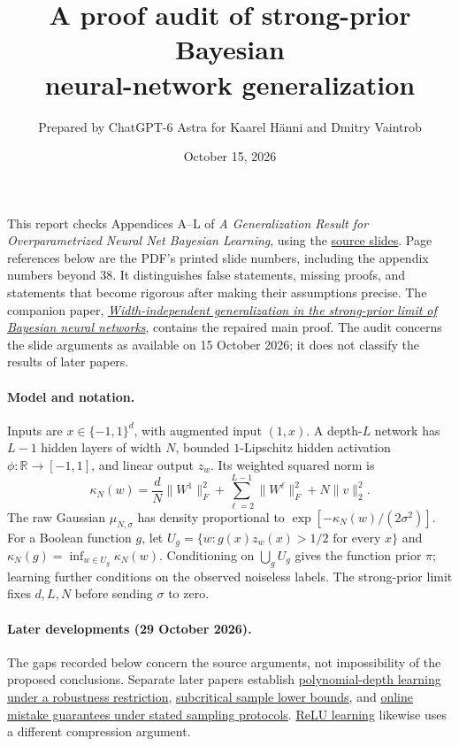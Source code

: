 \documentclass[11pt]{article}
\title{A proof audit of strong-prior Bayesian\\neural-network generalization}
\author{Prepared by ChatGPT-6 Astra for Kaarel H\"anni and Dmitry Vaintrob}
\date{October 15, 2026}
\newcommand{\R}{\mathbb R}
\begin{document}
\maketitle

This report checks Appendices A--L of \emph{A Generalization Result for Overparametrized Neural Net Bayesian Learning}, using the \href{https://kaarelh.github.io/ai/nnbayes-generalization.pdf}{source slides}. Page references below are the PDF's printed slide numbers, including the appendix numbers beyond 38. It distinguishes false statements, missing proofs, and statements that become rigorous after making their assumptions precise. The companion paper, \href{https://github.com/kaarelh/AI-works/blob/main/neural-network-generalization/main-results/strong-prior-generalization/paper.pdf}{\emph{Width-independent generalization in the strong-prior limit of Bayesian neural networks}}, contains the repaired main proof. The audit concerns the slide arguments as available on 15 October 2026; it does not classify the results of later papers.

\paragraph{Model and notation.}
Inputs are $x\in\{-1,1\}^d$, with augmented input $(1,x)$.
A depth-$L$ network has $L-1$ hidden layers of width $N$, bounded
$1$-Lipschitz hidden activation $\phi:\R\to[-1,1]$, and linear output $z_w$.
Its weighted squared norm is
\[
 \kappa_N(w)=\frac dN\|W^1\|_F^2+
 \sum_{\ell=2}^{L-1}\|W^\ell\|_F^2+N\|v\|_2^2.
\]
The raw Gaussian $\mu_{N,\sigma}$ has density proportional to
$\exp[-\kappa_N(w)/(2\sigma^2)]$.
For a Boolean function $g$, let
$U_g=\{w:g(x)z_w(x)>1/2\text{ for every }x\}$ and
$\kappa_N(g)=\inf_{w\in U_g}\kappa_N(w)$.
Conditioning on $\bigcup_g U_g$ gives the function prior $\pi$;
learning further conditions on the observed noiseless labels.
The strong-prior limit fixes $d,L,N$ before sending $\sigma$ to zero.

\paragraph{Later developments (29 October 2026).}
The gaps recorded below concern the source arguments, not impossibility
of the proposed conclusions. Separate later papers establish
\href{https://github.com/kaarelh/AI-works/blob/main/neural-network-generalization/main-results/robust-polynomial-depth/paper.pdf}{polynomial-depth learning under a robustness restriction}, \href{https://github.com/kaarelh/AI-works/blob/main/neural-network-generalization/main-results/subcritical-exponential/paper.pdf}{subcritical sample lower bounds}, and \href{https://github.com/kaarelh/AI-works/blob/main/neural-network-generalization/works-in-progress/online-mistakes/README.md}{online mistake guarantees under stated sampling protocols}. \href{https://github.com/kaarelh/AI-works/blob/main/neural-network-generalization/works-in-progress/relu-learning/paper.pdf}{ReLU learning} likewise uses a different compression argument.
\end{document}
